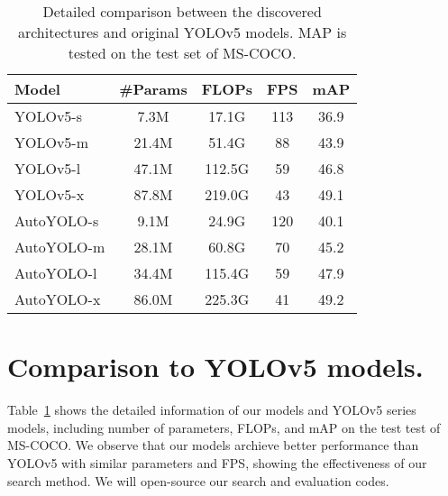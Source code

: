 \documentclass[letterpaper]{article} \usepackage{aaai22}  \usepackage{times}  \usepackage{helvet}  \usepackage{courier}  \usepackage[hyphens]{url}  \usepackage{graphicx} \urlstyle{rm} \def\UrlFont{\rm}  \usepackage{natbib}  \usepackage{caption} \DeclareCaptionStyle{ruled}{labelfont=normalfont,labelsep=colon,strut=off} \frenchspacing  \setlength{\pdfpagewidth}{8.5in}  \setlength{\pdfpageheight}{11in}
\begin{document}
\begin{table}[bt]
    \centering
\caption{Detailed comparison between the discovered architectures and original YOLOv5 models. MAP is tested on the test set of MS-COCO.}
    \label{tab:results}
    \vspace{-8pt}
\begin{tabular}{lcccc}
        \toprule
        \textbf{Model}    & \textbf{\#Params} & \textbf{FLOPs} & \textbf{FPS} & \textbf{mAP} \\ 
        \midrule
        YOLOv5-s & 7.3M & 17.1G & 113 & 36.9 \\
        YOLOv5-m & 21.4M & 51.4G & 88 & 43.9 \\
        YOLOv5-l & 47.1M & 112.5G & 59 & 46.8 \\
        YOLOv5-x & 87.8M & 219.0G & 43 & 49.1 \\
        \midrule
        AutoYOLO-s & 9.1M & 24.9G & 120 & 40.1 \\
        AutoYOLO-m & 28.1M & 60.8G & 70 & 45.2 \\
        AutoYOLO-l & 34.4M & 115.4G & 59 & 47.9 \\
        AutoYOLO-x & 86.0M & 225.3G & 41 & 49.2 \\
        \bottomrule
        \end{tabular}
\end{table}

\section{Comparison to YOLOv5 models.}
Table~\ref{tab:results} shows the detailed information of our models and YOLOv5 series models, including number of parameters, FLOPs, and mAP on the test test of MS-COCO. We observe that our models archieve better performance than YOLOv5 with similar parameters and FPS, showing the effectiveness of our search method. We will open-source our search and evaluation codes.




\end{document}
